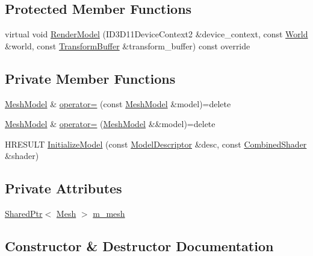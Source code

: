 \subsection*{Protected Member Functions}
\begin{DoxyCompactItemize}
\item 
virtual void \hyperlink{classmage_1_1_mesh_model_a3ea5bfb0599768712bbd2e46a7d2ff80}{Render\+Model} (I\+D3\+D11\+Device\+Context2 \&device\+\_\+context, const \hyperlink{classmage_1_1_world}{World} \&world, const \hyperlink{structmage_1_1_transform_buffer}{Transform\+Buffer} \&transform\+\_\+buffer) const override
\end{DoxyCompactItemize}
\subsection*{Private Member Functions}
\begin{DoxyCompactItemize}
\item 
\hyperlink{classmage_1_1_mesh_model}{Mesh\+Model} \& \hyperlink{classmage_1_1_mesh_model_a0cffe92f76d2470c67ae71a5a4046259}{operator=} (const \hyperlink{classmage_1_1_mesh_model}{Mesh\+Model} \&model)=delete
\item 
\hyperlink{classmage_1_1_mesh_model}{Mesh\+Model} \& \hyperlink{classmage_1_1_mesh_model_ab01cee26691745ec7cd1af933bb5fa99}{operator=} (\hyperlink{classmage_1_1_mesh_model}{Mesh\+Model} \&\&model)=delete
\item 
H\+R\+E\+S\+U\+LT \hyperlink{classmage_1_1_mesh_model_a9971552f5c866b8ed221df056c46a42d}{Initialize\+Model} (const \hyperlink{classmage_1_1_model_descriptor}{Model\+Descriptor} \&desc, const \hyperlink{structmage_1_1_combined_shader}{Combined\+Shader} \&shader)
\end{DoxyCompactItemize}
\subsection*{Private Attributes}
\begin{DoxyCompactItemize}
\item 
\hyperlink{namespacemage_a1e01ae66713838a7a67d30e44c67703e}{Shared\+Ptr}$<$ \hyperlink{classmage_1_1_mesh}{Mesh} $>$ \hyperlink{classmage_1_1_mesh_model_ad9d71a65feff8c14b7272891cd42cfd4}{m\+\_\+mesh}
\end{DoxyCompactItemize}


\subsection{Constructor \& Destructor Documentation}
\hypertarget{classmage_1_1_mesh_model_a95d70993b56b1a649797880583daf3db}{}\label{classmage_1_1_mesh_model_a95d70993b56b1a649797880583daf3db} 
